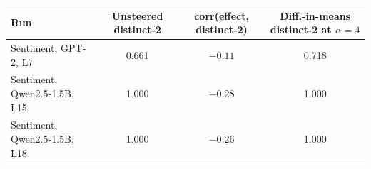 \begin{tabular}{@{}l ccc@{}}
\toprule
Run & Unsteered distinct-2 & corr(effect, distinct-2) & Diff.-in-means distinct-2 at $\alpha{=}4$ \\
\midrule
Sentiment, GPT-2, L7 & 0.661 & $-0.11$ & 0.718 \\
Sentiment, Qwen2.5-1.5B, L15 & 1.000 & $-0.28$ & 1.000 \\
Sentiment, Qwen2.5-1.5B, L18 & 1.000 & $-0.26$ & 1.000 \\
\bottomrule
\end{tabular}